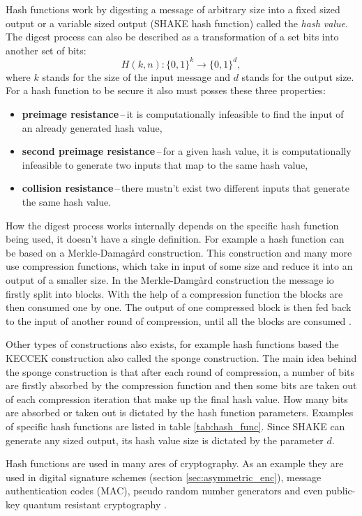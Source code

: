 Hash functions work by digesting a message of arbitrary size into a fixed sized output or a variable sized output (SHAKE hash function) called the \textit{hash value}. The digest process can also be described as a transformation of a set bits into another set of bits:
\begin{equation}
  H(k, n): \{0,1\}^k \rightarrow \{0,1\}^d,
\end{equation}
where $k$ stands for the size of the input message and $d$ stands for the output size. For a hash function to be secure it also must posses these three properties\cite{Paar2010}:
\begin{itemize}
  \item \textbf{preimage resistance}\,--\,it is computationally infeasible to find the input of an already generated hash value,
  \item \textbf{second preimage resistance}\,--\,for a given hash value, it is computationally infeasible to generate two inputs that map to the same hash value,
  \item \textbf{collision resistance}\,--\,there mustn't exist two different inputs that generate the same hash value.
\end{itemize}

How the digest process works internally depends on the specific hash function being used, it doesn't have a single definition. For example a hash function can be based on a Merkle-Damag\aa rd construction. This construction and many more use compression functions, which take in input of some size and reduce it into an output of a smaller size. In the Merkle-Damg\aa rd construction the message io firstly split into blocks. With the help of a compression function the blocks are then consumed one by one. The output of one compressed block is then fed back to the input of another round of compression, until all the blocks are consumed \cite{Smart2004}. 

Other types of constructions also exists, for example hash functions based the KECCEK construction also called the sponge construction. The main idea behind the sponge construction is that after each round of compression, a number of bits are firstly absorbed by the compression function and then some bits are taken out of each compression iteration that make up the final hash value. How many bits are absorbed or taken out is dictated by the hash function parameters. \cite{1Od8f4TuMxetfmHu} Examples of specific hash functions are listed in table \ref{tab:hash_func}. Since SHAKE can generate any sized output, its hash value size is dictated by the parameter $d$.


Hash functions are used in many ares of cryptography. As an example they are used in digital signature schemes (section \ref{sec:asymmetric_enc}), message authentication codes (\acs{MAC}), pseudo random number generators and even public-key quantum resistant cryptography \cite{Chen2016}. 


